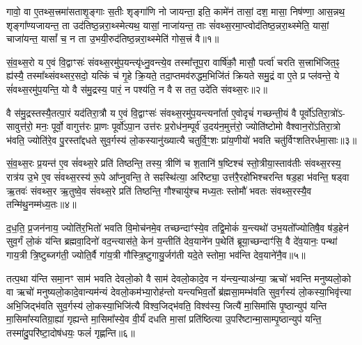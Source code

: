 \setcounter{anuvakam}{0}
गावो॒ वा ए॒तथ्स॒त्त्रमा॑सताशृ॒ङ्गाः स॒तीः शृङ्गा॑णि नो जायन्ता॒ इति॒ कामे॑न॑ तासां॒ दश॒ मासा॒ निष॑ण्णा॒ आस॒न्नथ॒ शृङ्गा᳚ण्यजायन्त॒ ता उद॑तिष्ठ॒न्नरा॒थ्स्मेत्यथ॒ यासां॒ नाजा॑यन्त॒ ताः सं॑वथ्स॒रमा॒प्त्वोद॑तिष्ठ॒न्नरा॒थ्स्मेति॒ यासां॒ चाजा॑यन्त॒ यासां᳚ च॒ न ता उ॒भयी॒रुद॑तिष्ठ॒न्नरा॒थ्स्मेति॑ गोस॒त्त्रं वै॥१॥

सं॒व॒थ्स॒रो य ए॒वं वि॒द्वाꣳसः॑ संवथ्स॒रमु॑प॒यन्त्यृ॑ध्नु॒वन्त्ये॒व तस्मा᳚त्तूप॒रा वार्\mbox{}षि॑कौ॒ मासौ॒ पर्त्वा॑ चरति स॒त्त्राभि॑जित॒ꣴ॒ ह्य॑स्यै॒ तस्मा᳚थ्संवथ्सर॒सदो॒ यत्किं च॑ गृ॒हे क्रि॒यते॒ तदा॒प्तमव॑रुद्धम॒भिजि॑तं क्रियते समु॒द्रं वा ए॒ते प्र प्ल॑वन्ते॒ ये सं॑वथ्स॒रमु॑प॒यन्ति॒ यो वै स॑मु॒द्रस्य॒ पारं॒ न पश्य॑ति॒ न वै स तत॒ उदे॑ति संवथ्स॒रः॥२॥

वै स॑मु॒द्रस्तस्यै॒तत्पा॒रं यद॑तिरा॒त्रौ य ए॒वं वि॒द्वाꣳसः॑ संवथ्स॒रमु॑प॒यन्त्यना᳚र्ता ए॒वोदृचं॑ गच्छन्ती॒यं वै पूर्वो॑\-ऽतिरा॒त्रो॑\-ऽ- सावुत्त॑रो॒ मनः॒ पूर्वो॒ वागुत्त॑रः प्रा॒णः पूर्वो॑\-ऽपा॒न उत्त॑रः प्र॒रोध॑न॒म्पूर्व॑ उ॒दय॑न॒मुत्त॑रो॒ ज्योति॑ष्टोमो वैश्वान॒रो॑\-ऽतिरा॒त्रो भ॑वति॒ ज्योति॑रे॒व पु॒रस्ता᳚द्दधते सुव॒र्गस्य॑ लो॒कस्यानु॑ख्यात्यै चतुर्वि॒ꣳ॒शः प्रा॑य॒णीयो॑ भवति चतु॑र्विꣳशतिरर्धमा॒साः॥३॥

सं॒व॒थ्स॒रः प्र॒यन्त॑ ए॒व सं॑वथ्स॒रे प्रति॑ तिष्ठन्ति॒ तस्य॒ त्रीणि॑ च श॒तानि॑ ष॒ष्टिश्च॑ स्तो॒त्रीया॒स्ताव॑तीः संवथ्स॒रस्य॒ रात्र॑य उ॒भे ए॒व सं॑वथ्स॒रस्य॑ रू॒पे आ᳚प्नुवन्ति॒ ते सꣴस्थि॑त्या॒ अरि॑ष्ट्या॒ उत्त॑रै॒रहो॑भिश्चरन्ति षड॒हा भ॑वन्ति॒ षड्वा ऋ॒तवः॑ संवथ्स॒र ऋ॒तुष्वे॒व सं॑वथ्स॒रे प्रति॑ तिष्ठन्ति॒ गौश्चायु॑श्च मध्य॒तः स्तोमौ॑ भवतः संवथ्स॒रस्यै॒व तन्मि॑थु॒नम्म॑ध्य॒तः॥४॥

द॒ध॒ति॒ प्र॒जन॑नाय॒ ज्योति॑र॒भितो॑ भवति वि॒मोच॑नमे॒व तच्छन्दाꣳ॑स्ये॒व तद्वि॒मोकं॑ य॒न्त्यथो॑ उभ॒यतो᳚ज्योतिषै॒व ष॑ड॒हेन॑ सुव॒र्गं लो॒कं य॑न्ति ब्रह्मवा॒दिनो॑ वद॒न्त्यास॑ते॒ केन॑ य॒न्तीति॑ देव॒याने॑न प॒थेति॑ ब्रूया॒च्छन्दाꣳ॑सि॒ वै दे॑व॒यानः॒ पन्था॑ गाय॒त्री त्रि॒ष्टुब्जग॑ती॒ ज्योति॒र्वै गा॑य॒त्री गौस्त्रि॒ष्टुगायु॒र्जग॑ती यदे॒ते स्तोमा॒ भव॑न्ति देव॒याने॑नै॒व॥५॥

तत्प॒था य॑न्ति समा॒नꣳ साम॑ भवति देवलो॒को वै साम॑ देवलो॒कादे॒व न य॑न्त्य॒न्याअ॑न्या॒ ऋचो॑ भवन्ति मनुष्यलो॒को वा ऋचो॑ मनुष्यलो॒कादे॒वान्यम॑न्यं देवलो॒कम॑भ्या॒रोह॑न्तो यन्त्यभिव॒र्तो ब्र॑ह्मसा॒मम्भ॑वति सुव॒र्गस्य॑ लो॒कस्या॒भिवृ॑त्त्या अभि॒जिद्भ॑वति सुव॒र्गस्य॑ लो॒कस्या॒भिजि॑त्यै विश्व॒जिद्भ॑वति॒ विश्व॑स्य॒ जित्यै॑ मा॒सिमा॑सि पृ॒ष्ठान्युप॑ यन्ति मा॒सिमा᳚स्यतिग्रा॒ह्या॑ गृह्यन्ते मा॒सिमा᳚स्ये॒व वी॒र्यं॑ दधति मा॒सां प्रति॑ष्ठित्या उ॒परि॑ष्टान्मा॒साम्पृ॒ष्ठान्युप॑ यन्ति॒ तस्मा॑दु॒परि॑ष्टा॒दोष॑धयः॒ फलं॑ गृह्णन्ति॥६॥

